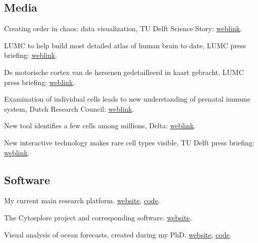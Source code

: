 \documentclass[10pt,a4paper,roman,final]{moderncv}
\begin{document}
\subsection*{Media}
\begin{description}[style=multiline,leftmargin=2.0cm,font=\normalfont]
\item[2024] Creating order in chaos: data visualization, TU Delft Science Story: \href{https://www.tudelft.nl/en/stories/articles/creating-order-in-chaos-data-visualization}{\underline{weblink}}.
\item[2022] LUMC to help build most detailed atlas of human brain to date, LUMC press briefing: \href{https://www.lumc.nl/en/news/2022/lumc-to-help-build-most-detailed-atlas-of-human-brain-to-date/}{\underline{weblink}}.
\item[2021] De motorische cortex van de hersenen gedetailleerd in kaart gebracht, LUMC press briefing: \href{https://www.lumc.nl/actueel/2021/de-motorische-cortex-van-de-hersenen-gedetailleerd-in-kaart-gebracht/}{\underline{weblink}}.
\item[2019] Examination of individual cells leads to new understanding of prenatal immune system, Dutch Research Council: \href{https://www.nwo.nl/en/news/examination-of-individual-cells-leads-to-new-understanding-of-prenatal-immune-system}{\underline{weblink}}.
\item[2017] New tool identifies a few cells among millions, Delta: \href{https://www.delta.tudelft.nl/article/new-tool-identifies-few-cells-among-millions}{\underline{weblink}}.
\item[2017] New interactive technology makes rare cell types visible, TU Delft press briefing: \href{https://phys.org/news/2017-12-interactive-technology-rare-cell-visible.html}{\underline{weblink}}.
\end{description}

\subsection*{Software}
\begin{description}[style=multiline,leftmargin=2.0cm,font=\normalfont]
\item[ManiVault] My current main research platform. \href{https://www.manivault.studio}{\underline{website}}, \href{https://github.com/manivaultstudio}{\underline{code}}.
\item[Cytosplore] The Cytosplore project and corresponding software. \href{https://www.cytosplore.org}{\underline{website}}.
\item[Ovis] Visual analysis of ocean forecasts, created during my PhD. \href{https://ovis.thomashollt.com}{\underline{website}}, \href{https://www.github.com/thoellt/ovis}{\underline{code}}.
\end{description}
\end{document}
